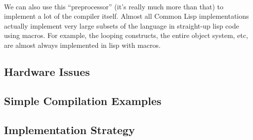 \documentclass {article}
\begin{document}
\paragraph{}
We can also use this ``preprocessor'' (it's really much more than
that) to implement a lot of the compiler itself.  Almost all Common
Lisp implementations actually implement very large subsets of the
language in straight-up lisp code using macros.  For example, the
looping constructs, the entire object system, etc, are almost always
implemented in lisp with macros.



\subsection{Hardware Issues}
\subsection{Simple Compilation Examples}
\subsection{Implementation Strategy}
\end{document}
